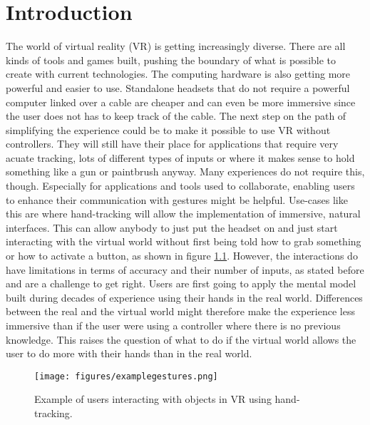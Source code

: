 
\chapter{Introduction}
The world of virtual reality (VR) is getting increasingly diverse. There are all kinds of tools and games built, pushing the boundary of what is possible to create with current technologies. The computing hardware is also getting more powerful and easier to use. Standalone headsets that do not require a powerful computer linked over a cable are cheaper and can even be more immersive since the user does not has to keep track of the cable. The next step on the path of simplifying the experience could be to make it possible to use VR without controllers. They will still have their place for applications that require very acuate tracking, lots of different types of inputs or where it makes sense to hold something like a gun or paintbrush anyway. Many experiences do not require this, though. Especially for applications and tools used to collaborate, enabling users to enhance their communication with gestures might be helpful. Use-cases like this are where hand-tracking will allow the implementation of immersive, natural interfaces. This can allow anybody to just put the headset on and just start interacting with the virtual world without first being told how to grab something or how to activate a button, as shown in figure \ref{fig:example}. However, the interactions do have limitations in terms of accuracy and their number of inputs, as stated before and are a challenge to get right. Users are first going to apply the mental model built during decades of experience using their hands in the real world. Differences between the real and the virtual world might therefore make the experience less immersive than if the user were using a controller where there is no previous knowledge. This raises the question of what to do if the virtual world allows the user to do more with their hands than in the real world. 

\begin{figure}[!ht]
    \centering
    \texttt{[image: figures/examplegestures.png]}
    \caption{Example of users interacting with objects in VR using hand-tracking. \cite{Han}}
    \label{fig:example}
\end{figure}



